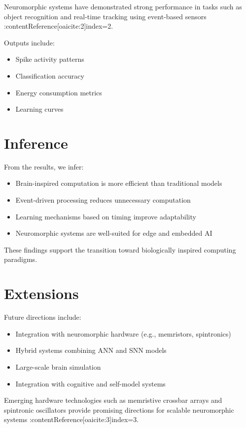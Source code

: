 \documentclass[12pt]{article}
\begin{document}
Neuromorphic systems have demonstrated strong performance in tasks such as object recognition and real-time tracking using event-based sensors :contentReference[oaicite:2]{index=2}.

Outputs include:

\begin{itemize}
\item Spike activity patterns
\item Classification accuracy
\item Energy consumption metrics
\item Learning curves
\end{itemize}

\section{Inference}

From the results, we infer:

\begin{itemize}
\item Brain-inspired computation is more efficient than traditional models
\item Event-driven processing reduces unnecessary computation
\item Learning mechanisms based on timing improve adaptability
\item Neuromorphic systems are well-suited for edge and embedded AI
\end{itemize}

These findings support the transition toward biologically inspired computing paradigms.

\section{Extensions}

Future directions include:

\begin{itemize}
\item Integration with neuromorphic hardware (e.g., memristors, spintronics)
\item Hybrid systems combining ANN and SNN models
\item Large-scale brain simulation
\item Integration with cognitive and self-model systems
\end{itemize}

Emerging hardware technologies such as memristive crossbar arrays and spintronic oscillators provide promising directions for scalable neuromorphic systems :contentReference[oaicite:3]{index=3}.
\end{document}
